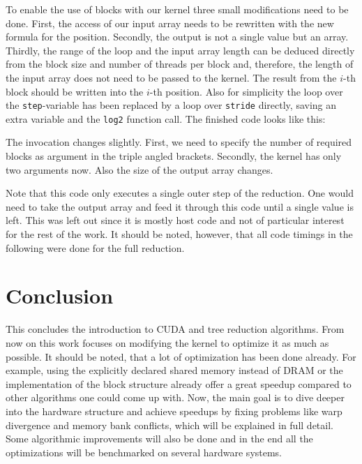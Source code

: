 To enable the use of blocks with our kernel three small modifications need to be done.
First, the access of our input array needs to be rewritten with the new formula for the position.
Secondly, the output is not a single value but an array.
Thirdly, the range of the loop and the input array length can be deduced directly from the block size and number of threads per block and, therefore, the length of the input array does not need to be passed to the kernel.
The result from the \(i\)-th block should be written into the \(i\)-th position.
Also for simplicity the loop over the \texttt{step}-variable has been replaced by a loop over \texttt{stride} directly, saving an extra variable and the \texttt{log2} function call.
The finished code looks like this:



The invocation changes slightly.
First, we need to specify the number of required blocks as argument in the triple angled brackets.
Secondly, the kernel has only two arguments now.
Also the size of the output array changes.



Note that this code only executes a single outer step of the reduction.
One would need to take the output array and feed it through this code until a single value is left.
This was left out since it is mostly host code and not of particular interest for the rest of the work.
It should be noted, however, that all code timings in the following were done for the full reduction.

\section{Conclusion}
This concludes the introduction to CUDA and tree reduction algorithms.
From now on this work focuses on modifying the kernel to optimize it as much as possible.
It should be noted, that a lot of optimization has been done already.
For example, using the explicitly declared shared memory instead of DRAM or the implementation of the block structure already offer a great speedup compared to other algorithms one could come up with.
Now, the main goal is to dive deeper into the hardware structure and achieve speedups by fixing problems like warp divergence and memory bank conflicts, which will be explained in full detail.
Some algorithmic improvements will also be done and in the end all the optimizations will be benchmarked on several hardware systems.
